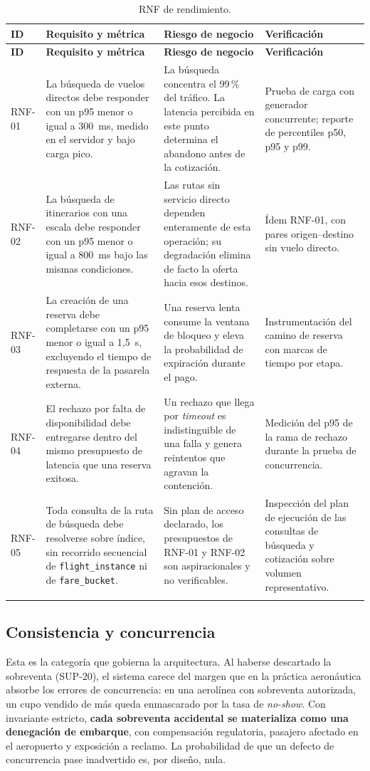 \documentclass[10pt,letterpaper]{article}
\begin{document}
\begin{longtable}{@{}L{1.5cm} L{5.0cm} L{4.6cm} L{4.9cm}@{}}
\toprule \textbf{ID} & \textbf{Requisito y métrica} & \textbf{Riesgo de negocio} & \textbf{Verificación} \\ \midrule \endfirsthead
\toprule \textbf{ID} & \textbf{Requisito y métrica} & \textbf{Riesgo de negocio} & \textbf{Verificación} \\ \midrule \endhead
RNF-01 & La búsqueda de vuelos directos debe responder con un p95 menor o igual a 300~ms, medido en el servidor y bajo carga pico. & La búsqueda concentra el 99\,\% del tráfico. La latencia percibida en este punto determina el abandono antes de la cotización. & Prueba de carga con generador concurrente; reporte de percentiles p50, p95 y p99. \\
RNF-02 & La búsqueda de itinerarios con una escala debe responder con un p95 menor o igual a 800~ms bajo las mismas condiciones. & Las rutas sin servicio directo dependen enteramente de esta operación; su degradación elimina de facto la oferta hacia esos destinos. & Ídem RNF-01, con pares origen--destino sin vuelo directo. \\
RNF-03 & La creación de una reserva debe completarse con un p95 menor o igual a 1{,}5~s, excluyendo el tiempo de respuesta de la pasarela externa. & Una reserva lenta consume la ventana de bloqueo y eleva la probabilidad de expiración durante el pago. & Instrumentación del camino de reserva con marcas de tiempo por etapa. \\
RNF-04 & El rechazo por falta de disponibilidad debe entregarse dentro del mismo presupuesto de latencia que una reserva exitosa. & Un rechazo que llega por \emph{timeout} es indistinguible de una falla y genera reintentos que agravan la contención. & Medición del p95 de la rama de rechazo durante la prueba de concurrencia. \\
RNF-05 & Toda consulta de la ruta de búsqueda debe resolverse sobre índice, sin recorrido secuencial de \texttt{flight\_instance} ni de \texttt{fare\_bucket}. & Sin plan de acceso declarado, los presupuestos de RNF-01 y RNF-02 son aspiracionales y no verificables. & Inspección del plan de ejecución de las consultas de búsqueda y cotización sobre volumen representativo. \\
\bottomrule
\caption{RNF de rendimiento.}
\end{longtable}

\subsection{Consistencia y concurrencia}
Esta es la categoría que gobierna la arquitectura. Al haberse descartado la sobreventa (SUP-20), el sistema carece del margen que en la práctica aeronáutica absorbe los errores de concurrencia: en una aerolínea con sobreventa autorizada, un cupo vendido de más queda enmascarado por la tasa de \emph{no-show}. Con invariante estricto, \textbf{cada sobreventa accidental se materializa como una denegación de embarque}, con compensación regulatoria, pasajero afectado en el aeropuerto y exposición a reclamo. La probabilidad de que un defecto de concurrencia pase inadvertido es, por diseño, nula.
\end{document}
